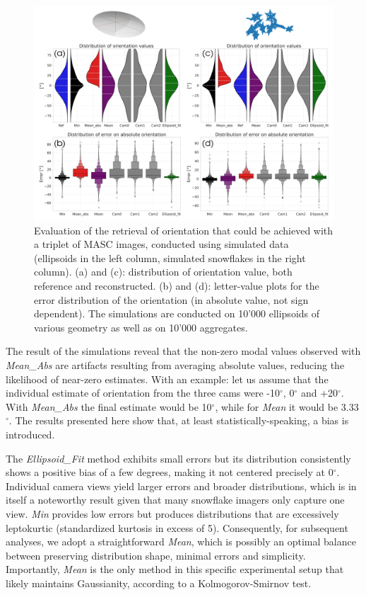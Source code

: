 \documentclass[draft]{agujournal2019}
\begin{document}
\begin{figure}
 \noindent \centering \includegraphics[width=\textwidth]{Fig02.png}
\caption{Evaluation of the retrieval of orientation that could be achieved with a triplet of MASC images, conducted using simulated data (ellipsoids in the left column, simulated snowflakes in the right column). (a) and (c): distribution of orientation value, both reference and reconstructed. (b) and (d): letter-value plots for the  error distribution of the orientation (in absolute value, not sign dependent). The simulations are conducted on 10'000 ellipsoids of various geometry as well as on 10'000 aggregates. }
\label{fig:simulations}
\end{figure}

The result of the simulations reveal that the non-zero modal values observed with \textit{Mean\_Abs} are artifacts resulting from averaging absolute values, reducing the likelihood of near-zero estimates. With an example: let us assume that the individual estimate of orientation from the three cams were -10$^\circ$, 0$^\circ$ and +20$^\circ$. With \textit{Mean\_Abs} the final estimate would be 10$^\circ$, while for \textit{Mean} it would be 3.33$^\circ$. The results presented here show that, at least statistically-speaking, a bias is introduced. 

The \textit{Ellipsoid\_Fit} method exhibits small errors but its distribution consistently shows a positive bias of a few degrees, making it not centered precisely at 0$^\circ$. Individual camera views yield larger errors and broader distributions, which is in itself a noteworthy result given that many snowflake imagers only capture one view. \textit{Min} provides low errors but produces distributions that are excessively leptokurtic (standardized kurtosis in excess of 5). Consequently, for subsequent analyses, we adopt a straightforward \textit{Mean}, which is possibly an optimal balance between preserving distribution shape, minimal errors and simplicity. Importantly, \textit{Mean} is the only method in this specific experimental setup that likely maintains Gaussianity,  according to a Kolmogorov-Smirnov test.
\end{document}
